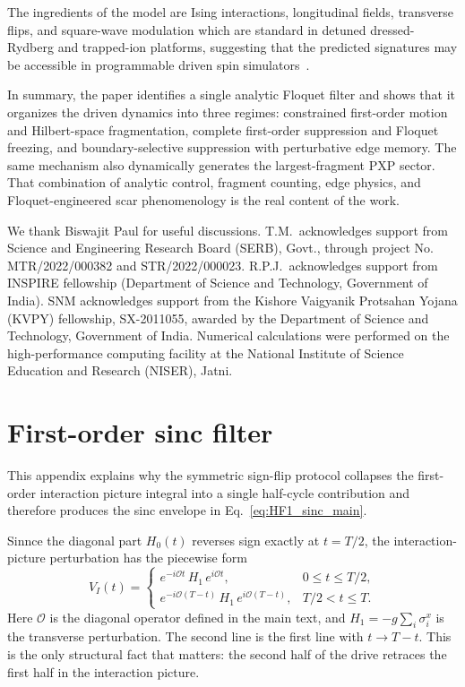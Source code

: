 \documentclass[aps,prb,reprint,twocolumn,amsmath,amssymb,citeautoscript]{revtex4-2}
\begin{document}
The ingredients of the model are Ising interactions, longitudinal fields, transverse flips, and square-wave modulation which are standard in detuned dressed-Rydberg and trapped-ion platforms, suggesting that the predicted signatures may be accessible in programmable driven spin simulators~\cite{Bernien2017Nature,BluvsteinEtAl2021Science,BlochDalibardZwerger2008RMP,TarruellSanchezPalencia2018CRPhys}.

In summary, the paper identifies a single analytic Floquet filter and shows that it organizes the driven dynamics into three regimes: constrained first-order motion and Hilbert-space fragmentation, complete first-order suppression and Floquet freezing, and boundary-selective suppression with perturbative edge memory. The same mechanism also dynamically generates the largest-fragment PXP sector. That combination of analytic control, fragment counting, edge physics, and Floquet-engineered scar phenomenology is the real content of the work.

\begin{acknowledgments}
We thank Biswajit Paul for useful discussions. T.M.\ acknowledges support from
Science and Engineering Research Board (SERB), Govt., through project No. MTR/2022/000382 and
STR/2022/000023. R.P.J.\ acknowledges support from INSPIRE fellowship (Department of Science and Technology, Government of India). SNM acknowledges support from the Kishore Vaigyanik Protsahan Yojana (KVPY) fellowship, SX-2011055, awarded by the Department of Science and Technology, Government of India. Numerical calculations were performed on the high-performance computing facility at the National Institute of Science Education and Research (NISER), Jatni.
\end{acknowledgments}


\appendix


\section{First-order sinc filter}
\label{app:floquet}

This appendix explains why the symmetric sign-flip protocol collapses the first-order interaction picture integral into a single half-cycle contribution and therefore produces the sinc envelope in Eq.~\eqref{eq:HF1_sinc_main}.

Sinnce the diagonal part $H_0(t)$ reverses sign exactly at $t=T/2$, the
interaction-picture perturbation has the piecewise form
\begin{equation}
V_I(t)=
\begin{cases}
e^{-i\mathcal{O}t}\,H_1\,e^{i\mathcal{O}t}, & 0\le t\le T/2,\\[4pt]
e^{-i\mathcal{O}(T-t)}\,H_1\,e^{i\mathcal{O}(T-t)}, & T/2<t\le T.
\end{cases}
\label{eq:app:VI_piecewise}
\end{equation}
Here $\mathcal{O}$ is the diagonal operator defined in the main text, and
$H_1=-g\sum_i \sigma_i^x$ is the transverse perturbation. The second line
is the first line with $t\to T-t$. This is the only structural fact that
matters: the second half of the drive retraces the first half in the
interaction picture.
\end{document}
